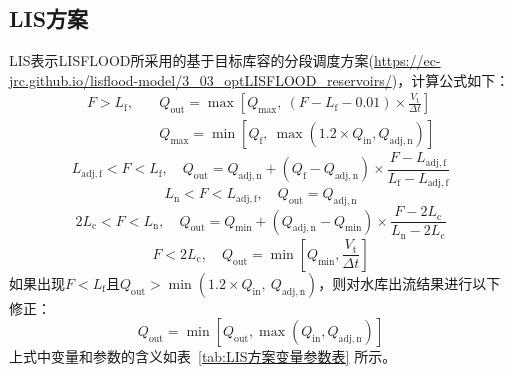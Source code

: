 \subsection{LIS方案}
LIS表示LISFLOOD所采用的基于目标库容的分段调度方案(\url{https://ec-jrc.github.io/lisflood-model/3\_03\_optLISFLOOD\_reservoirs/})，计算公式如下：
\begin{equation}
  \begin{aligned}
    F > L_{\mathrm{f}}, \quad &Q_{\mathrm{out}}=\max\left[Q_{\mathrm{max}},\ (F-L_{\mathrm{f}}-0.01) \times \frac{V_{\mathrm {t}} }{\Delta t}\right] \\
    \quad &Q_{\mathrm{max}} = \min\left[Q_{\mathrm{f}},\ {\max(1.2 \times Q_{\mathrm{in}},Q_{\mathrm{adj,n}})}\right]
  \end{aligned}
\end{equation}
\begin{equation}
  L_{\mathrm{adj,f}} < F < L_{\mathrm{f}}, \quad Q_{\mathrm{out}}=Q_{\mathrm{adj,n}}+\left(Q_{\mathrm{f}}-Q_{\mathrm{adj,n}}\right) \times \frac{F-L_{\mathrm{adj,f}}}{L_{\mathrm{f}}-L_{\mathrm{adj,f}}}
\end{equation}
\begin{equation}
  L_{\mathrm{n}} < F < L_{\mathrm{adj,f}}, \quad Q_{\mathrm{out}}=Q_{\mathrm{adj,n}}
\end{equation}
\begin{equation}
  2L_{\mathrm{c}} < F < L_{\mathrm{n}}, \quad Q_{\mathrm{out}}=Q_{\mathrm{min}}+\left(Q_{\mathrm{adj,n}}-Q_{\mathrm{min}}\right) \times \frac{F-2L_{\mathrm{c}}}{L_{\mathrm{n}}-2L_{\mathrm{c}}}
\end{equation}
\begin{equation}
  F < 2L_{\mathrm{c}}, \quad Q_{\mathrm{out}}=\min\left[Q_{\mathrm{min}}, \frac{V_{\mathrm {t}} }{\Delta t}\right]
\end{equation}
如果出现$F<L_{\mathrm{f}}$且$Q_{\mathrm{out}}>\min(1.2 \times Q_{\mathrm{in}},\ Q_{\mathrm{adj,n}})$，则对水库出流结果进行以下修正：
\begin{equation}
  Q_{\mathrm{out}} = \min\left[Q_{\mathrm{out}}, \max(Q_{\mathrm{in}}, Q_{\mathrm{adj,n}})\right]
\end{equation}
上式中变量和参数的含义如表~\ref{tab:LIS方案变量参数表} 所示。

